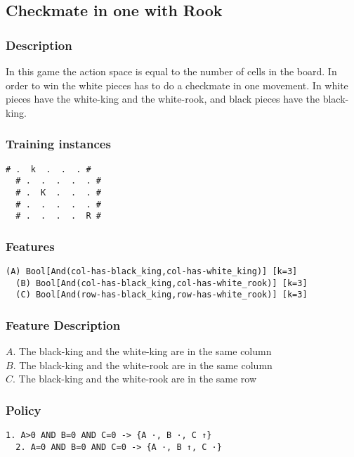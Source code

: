 \documentclass[a4paper]{article}
\begin{document}
\subsection{Checkmate in one with Rook}
\subsubsection{Description}
In this game the action space is equal to the number of cells in the board. In order to win the white pieces has to do a checkmate in one movement. In white pieces have the white-king and the white-rook, and black pieces have the black-king.

\subsubsection{Training instances}
\begin{Verbatim}[fontsize=\footnotesize]
  # .  k  .  .  . #
  # .  .  .  .  . #
  # .  K  .  .  . #
  # .  .  .  .  . #
  # .  .  .  .  R #
\end{Verbatim}

\subsubsection{Features}
\begin{Verbatim}[fontsize=\footnotesize]
  (A) Bool[And(col-has-black_king,col-has-white_king)] [k=3]
  (B) Bool[And(col-has-black_king,col-has-white_rook)] [k=3]
  (C) Bool[And(row-has-black_king,row-has-white_rook)] [k=3]
\end{Verbatim}

\subsubsection{Feature Description}
$A$. The black-king and the white-king are in the same column\\
$B$. The black-king and the white-rook are in the same column\\
$C$. The black-king and the white-rook are in the same row

\subsubsection{Policy}
\begin{Verbatim}[fontsize=\footnotesize]
  1. A>0 AND B=0 AND C=0 -> {A ·, B ·, C ↑}
  2. A=0 AND B=0 AND C=0 -> {A ·, B ↑, C ·}
\end{Verbatim}
\end{document}
